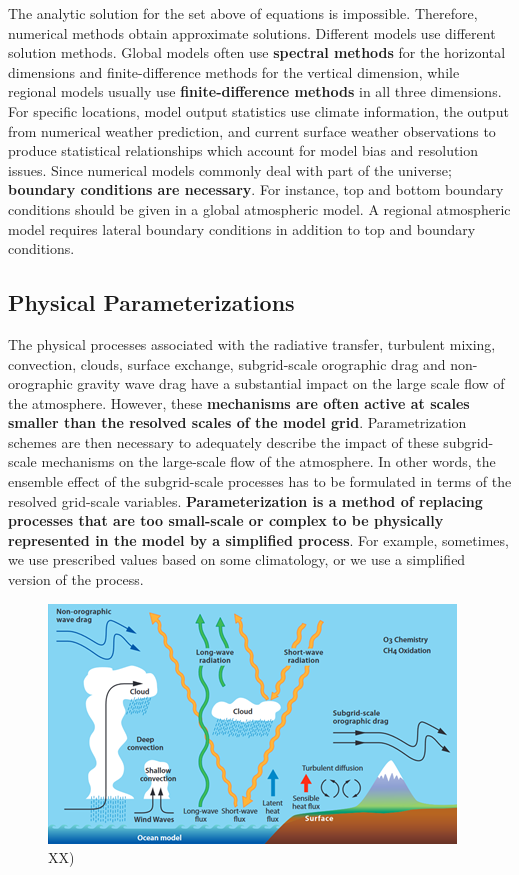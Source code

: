 \documentclass[12pt,oneside]{book}
\begin{document}
The analytic solution for the set above of equations is impossible.
Therefore, numerical methods obtain approximate solutions. Different
models use different solution methods. Global models often use
\textbf{spectral methods} for the horizontal dimensions and
finite-difference methods for the vertical dimension, while regional
models usually use \textbf{finite-difference methods} in all three
dimensions. For specific locations, model output statistics use climate
information, the output from numerical weather prediction, and current
surface weather observations to produce statistical relationships which
account for model bias and resolution issues. Since numerical models
commonly deal with part of the universe; \textbf{boundary conditions are
necessary}. For instance, top and bottom boundary conditions should be
given in a global atmospheric model. A regional atmospheric model
requires lateral boundary conditions in addition to top and boundary
conditions.

\subsection{Physical
Parameterizations}\label{physical-parameterizations}

The physical processes associated with the radiative transfer, turbulent
mixing, convection, clouds, surface exchange, subgrid-scale orographic
drag and non-orographic gravity wave drag have a substantial impact on
the large scale flow of the atmosphere. However, these
\textbf{mechanisms are often active at scales smaller than the resolved
scales of the model grid}. Parametrization schemes are then necessary to
adequately describe the impact of these subgrid-scale mechanisms on the
large-scale flow of the atmosphere. In other words, the ensemble effect
of the subgrid-scale processes has to be formulated in terms of the
resolved grid-scale variables. \textbf{Parameterization is a method of
replacing processes that are too small-scale or complex to be physically
represented in the model by a simplified process}. For example,
sometimes, we use prescribed values based on some climatology, or we use
a simplified version of the process.

\begin{figure}

{\centering \includegraphics[width=0.8\linewidth]{figures/Figure72} 

}

\caption{XX)}\label{fig:PhysicalParameterizations}
\end{figure}
\end{document}

